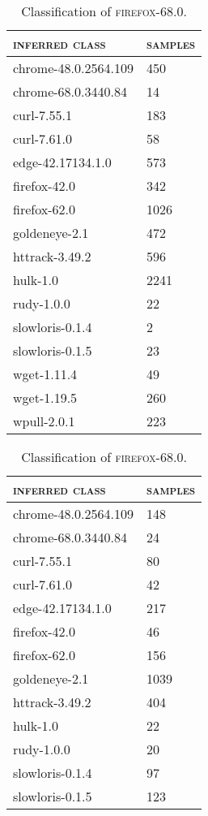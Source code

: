 \begin{table}[H]
	\centering
	\begin{subtable}{.45\linewidth}
		\centering
	\begin{tabular}{ll}
		\toprule
		\textsc{inferred class} & \textsc{samples}\\
		\midrule
		chrome-48.0.2564.109 & 450\\
		chrome-68.0.3440.84 & 14\\
		curl-7.55.1 & 183\\
		curl-7.61.0 & 58\\
		edge-42.17134.1.0 & 573\\
		firefox-42.0 & 342\\
		firefox-62.0 & 1026\\
		goldeneye-2.1 & 472\\
		httrack-3.49.2 & 596\\
		hulk-1.0 & 2241\\
		rudy-1.0.0 & 22\\
		slowloris-0.1.4 & 2\\
		slowloris-0.1.5 & 23\\
		wget-1.11.4 & 49\\
		wget-1.19.5 & 260\\
		wpull-2.0.1 & 223\\
		\bottomrule
	\end{tabular}
	\caption{Classification of \textsc{firefox-68.0}.}
	\end{subtable}
	\begin{subtable}{.45\linewidth}
		\centering
	\begin{tabular}{ll}
		\toprule
		\textsc{inferred class} & \textsc{samples}\\
		\midrule
		chrome-48.0.2564.109 & 148\\
		chrome-68.0.3440.84 & 24\\
		curl-7.55.1 & 80\\
		curl-7.61.0 & 42\\
		edge-42.17134.1.0 & 217\\
		firefox-42.0 & 46\\
		firefox-62.0 & 156\\
		goldeneye-2.1 & 1039\\
		httrack-3.49.2 & 404\\
		hulk-1.0 & 22\\
		rudy-1.0.0 & 20\\
		slowloris-0.1.4 & 97\\
		slowloris-0.1.5 & 123\\

\end{tabular}
\end{subtable}
\end{table}
